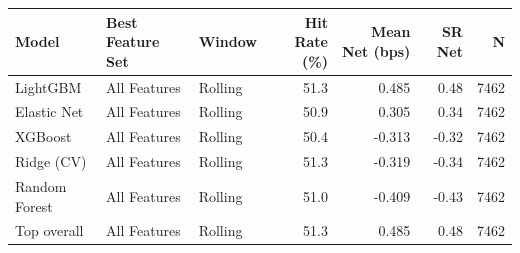 \begin{tabular}{lllrrrr}
\toprule
Model & Best Feature Set & Window & Hit Rate (\%) & Mean Net (bps) & SR Net & N \\
\midrule
LightGBM & All Features & Rolling & 51.3 & 0.485 & 0.48 & 7462 \\
Elastic Net & All Features & Rolling & 50.9 & 0.305 & 0.34 & 7462 \\
XGBoost & All Features & Rolling & 50.4 & -0.313 & -0.32 & 7462 \\
Ridge (CV) & All Features & Rolling & 51.3 & -0.319 & -0.34 & 7462 \\
Random Forest & All Features & Rolling & 51.0 & -0.409 & -0.43 & 7462 \\
\midrule
Top overall & All Features & Rolling & 51.3 & 0.485 & 0.48 & 7462 \\
\bottomrule
\end{tabular}
